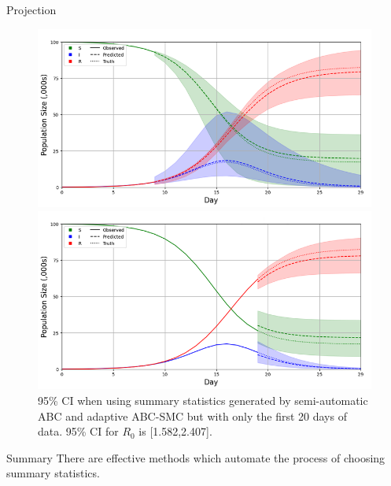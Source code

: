 \documentclass[aspectratio=169]{beamer}
\begin{document}
\begin{frame}{Projection}
  \begin{figure}[!htb]
    \centering
    \begin{minipage}{.5\textwidth}
        \centering\includegraphics[width=1\textwidth]{Semi_Auto_ABC_SMC_10_days_CI.png}
        \caption{95\% CI when using summary statistics generated by semi-automatic ABC and adaptive ABC-SMC but with only the first 10 days of data. 95\% CI for $R_0$ is [1.544,3.071].}
    \end{minipage}%
    \begin{minipage}{.5\textwidth}
        \centering\includegraphics[width=1\textwidth]{Semi_Auto_ABC_SMC_20_days_CI.png}
        \caption{95\% CI when using summary statistics generated by semi-automatic ABC and adaptive ABC-SMC but with only the first 20 days of data. 95\% CI for $R_0$ is [1.582,2.407].}
    \end{minipage}
  \end{figure}
\end{frame}

\begin{frame}[leftcolor=CoolGrey,rightcolor=UniversityRed,div=0.85\paperwidth]{Summary}
  There are effective methods which automate the process of choosing summary statistics.
\end{frame}
\end{document}
